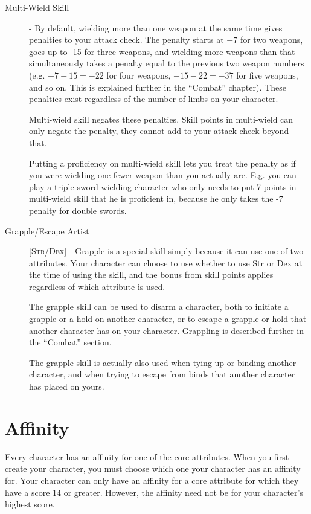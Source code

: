 \begin{description}
\item[Multi-Wield Skill] - By default, wielding more than one weapon at the same time gives penalties to your attack check. The penalty starts at $-7$ for two weapons, goes up to -15 for three weapons, and wielding more weapons than that simultaneously takes a penalty equal to the previous two weapon numbers (e.g. $-7-15 = -22$ for four weapons, $-15-22=-37$ for five weapons, and so on. This is explained further in the ``Combat'' chapter). These penalties exist regardless of the number of limbs on your character.

Multi-wield skill negates these penalties. Skill points in multi-wield can only negate the penalty, they cannot add to your attack check beyond that.

Putting a proficiency on multi-wield skill lets you treat the penalty as if you were wielding one fewer weapon than you actually are. E.g. you can play a triple-sword wielding character who only needs to put 7 points in multi-wield skill that he is proficient in, because he only takes the -7 penalty for double swords.

\item[Grapple/Escape Artist] [\textsc{Str}/\textsc{Dex}] - Grapple is a special skill simply because it can use one of two attributes. Your character can choose to use whether to use Str or Dex at the time of using the skill, and the bonus from skill points applies regardless of which attribute is used.

The grapple skill can be used to disarm a character, both to initiate a grapple or a hold on another character, or to escape a grapple or hold that another character has on your character. Grappling is described further in the ``Combat'' section.

The grapple skill is actually also used when tying up or binding another character, and when trying to escape from binds that another character has placed on yours.
\end{description}

\section{Affinity}
Every character has an affinity for one of the core attributes. When you first create your character, you must choose which one your character has an affinity for. Your character can only have an affinity for a core attribute for which they have a score 14 or greater. However, the affinity need not be for your character’s highest score.

